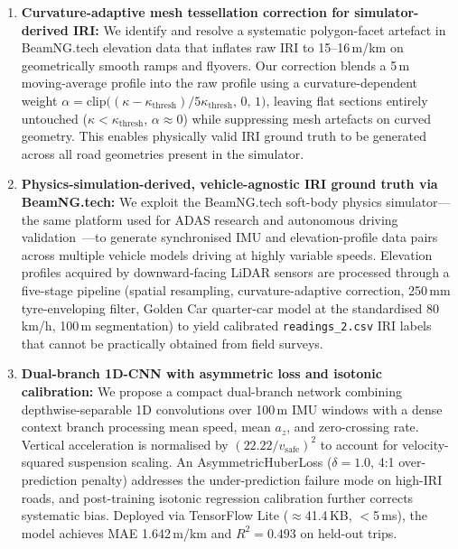 \documentclass[conference]{IEEEtran}
\begin{document}
\begin{enumerate}
    \item \textbf{Curvature-adaptive mesh tessellation correction for simulator-derived IRI:} We identify and resolve a systematic polygon-facet artefact in BeamNG.tech elevation data that inflates raw IRI to 15--16\,m/km on geometrically smooth ramps and flyovers.
Our correction blends a 5\,m moving-average profile into the raw profile using a curvature-dependent weight $\alpha = \text{clip}\bigl((\kappa - \kappa_{\text{thresh}}) / 5\kappa_{\text{thresh}},\, 0,\, 1\bigr)$, leaving flat sections entirely untouched ($\kappa < \kappa_{\text{thresh}}$, $\alpha \approx 0$) while suppressing mesh artefacts on curved geometry.
This enables physically valid IRI ground truth to be generated across all road geometries present in the simulator.

    \item \textbf{Physics-simulation-derived, vehicle-agnostic IRI ground truth via BeamNG.tech:} We exploit the BeamNG.tech soft-body physics simulator---the same platform used for ADAS research and autonomous driving validation~\cite{15}---to generate synchronised IMU and elevation-profile data pairs across multiple vehicle models driving at highly variable speeds.
Elevation profiles acquired by downward-facing LiDAR sensors are processed through a five-stage pipeline (spatial resampling, curvature-adaptive correction, 250\,mm tyre-enveloping filter, Golden Car quarter-car model at the standardised 80\,km/h, 100\,m segmentation) to yield calibrated \texttt{readings\_2.csv} IRI labels that cannot be practically obtained from field surveys.

    \item \textbf{Dual-branch 1D-CNN with asymmetric loss and isotonic calibration:} We propose a compact dual-branch network combining depthwise-separable 1D convolutions over 100\,m IMU windows with a dense context branch processing mean speed, mean $a_z$, and zero-crossing rate.
Vertical acceleration is normalised by $(22.22/v_{\text{safe}})^2$ to account for velocity-squared suspension scaling.
An AsymmetricHuberLoss ($\delta=1.0$, 4:1 over-prediction penalty) addresses the under-prediction failure mode on high-IRI roads, and post-training isotonic regression calibration further corrects systematic bias.
Deployed via TensorFlow Lite ($\approx$41.4\,KB, $<$5\,ms), the model achieves MAE 1.642\,m/km and $R^{2} = 0.493$ on held-out trips.


\end{enumerate}
\end{document}
